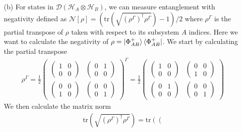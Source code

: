\documentclass[10pt, a4paper]{article}
\begin{document}
{\begin{enumerate}
  \item[(b)] For states in $\mathcal{D}(\mathcal{H}_A \otimes \mathcal{H}_B)$, we can measure entanglement with negativity defined as $\mathcal{N}[\rho] = (\text{tr}(\sqrt{(\rho^\Gamma)^{\dagger} \rho^\Gamma}) - 1)/2$ where $\rho^\Gamma$ is the partial transpose of $\rho$ taken with respect to its subsystem $A$ indices. Here we want to calculate the negativity of $\rho = \ket{\Phi^{+}_{AB}}\bra{\Phi^{+}_{AB}}$. We start by calculating the partial transpose 
  \begin{align*}
    \rho^{\Gamma} = \frac{1}{2}\begin{pmatrix}
      \begin{pmatrix}
        1 & 0\\
        0 & 0
      \end{pmatrix} &
      \begin{pmatrix}
        0 & 1\\
        0 & 0
      \end{pmatrix}\\
      \begin{pmatrix}
        0 & 0\\
        1 & 0
      \end{pmatrix} &
      \begin{pmatrix}
        0 & 0\\
        0 & 1
      \end{pmatrix}
    \end{pmatrix}^{\Gamma}
    = \frac{1}{2}
    \begin{pmatrix}
    \begin{pmatrix}
      1 & 0\\
      0 & 0
    \end{pmatrix} &
    \begin{pmatrix}
      0 & 0\\
      1 & 0
    \end{pmatrix}\\
    \begin{pmatrix}
      0 & 1\\
      0 & 0
    \end{pmatrix} &
    \begin{pmatrix}
      0 & 0\\
      0 & 1
    \end{pmatrix}
  \end{pmatrix}
  \end{align*}
  We then calculate the matrix norm 
  \begin{align*}
    \text{tr}(\sqrt{(\rho^\Gamma)^{\dagger} \rho^\Gamma}) = \text{tr}\left(\left(

\end{align*}
\end{enumerate}}
\end{document}
